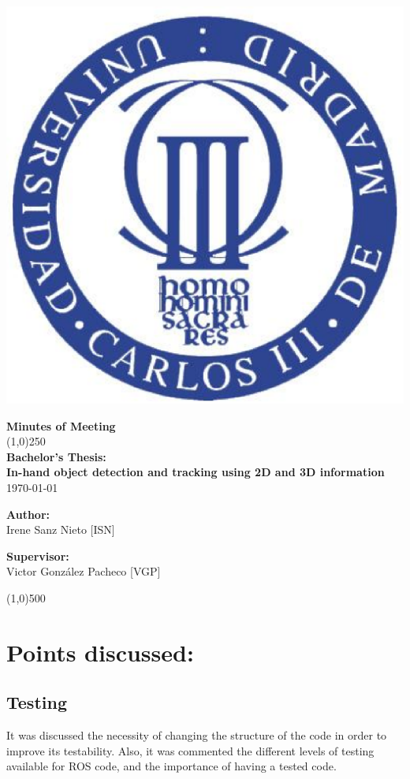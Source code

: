 \documentclass{article}
\newenvironment{myindentpar}[1]%
 {\begin{list}{}%
         {\setlength{\leftmargin}{#1}}%
         \item[]%
 }
 {\end{list}}
\begin{document}
\includegraphics[width=0.1\linewidth]{../template/uc3m.eps}

\vspace{-1cm}
\begin{minipage}[b]{1\linewidth}
	\begin{center}
	{\Huge \bfseries{Minutes of Meeting}}\\
	\line(1,0){250}\\[0.5cm]
	{\LARGE \textbf{Bachelor's Thesis:\\[0.5cm] In-hand object detection and tracking using 2D and 3D information}}\\[0.5cm]
	{\large \today}
	\end{center}
\end {minipage}



\begin{minipage}{0.55\textwidth}
\begin{flushleft} \large
\textbf{{Author:}\\}
Irene Sanz Nieto [ISN]\\
\end{flushleft}
\end{minipage}
\begin{minipage}{0.4\textwidth}
\begin{flushright} \large
\textbf{Supervisor: }\\
Victor González Pacheco [VGP]
\end{flushright}\end{minipage}

\begin{center}
\line(1,0){500}
\end{center}

\renewcommand{\thesubsection}
{\hspace*{1cm} \arabic{section}.\arabic{subsection}}



\section{\LARGE Points discussed: }
	\subsection{Testing}
		\begin{myindentpar}{1cm} 
It was discussed the necessity of changing the structure of the code in order to improve its testability. Also, it was commented the different levels of testing available for ROS code, and the importance of having a tested code. 
		\end{myindentpar}
\end{document}
